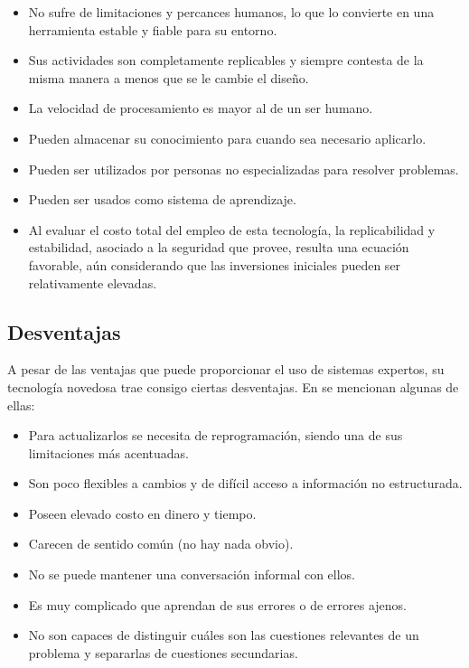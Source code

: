 \begin{itemize}
\item No sufre de limitaciones y percances humanos, lo que lo convierte en una herramienta estable y fiable para su entorno.
\item Sus actividades son completamente replicables y siempre contesta de la misma manera a menos que se le cambie el diseño.
\item La velocidad de procesamiento es mayor al de un ser humano.
\item Pueden almacenar su conocimiento para cuando sea necesario aplicarlo.
\item Pueden ser utilizados por personas no especializadas para resolver problemas.
\item Pueden ser usados como sistema de aprendizaje.
\item Al evaluar el costo total del empleo de esta tecnología, la replicabilidad y estabilidad, asociado a la seguridad que provee, resulta una ecuación favorable, aún considerando que las inversiones iniciales pueden ser
relativamente elevadas.
\end{itemize}

\subsection{Desventajas}
A pesar de las ventajas que puede proporcionar el uso de sistemas expertos, su tecnología novedosa trae consigo ciertas desventajas. En \cite{SystemExpertsEstudents} se mencionan algunas de ellas:

\begin{itemize}
\item Para actualizarlos se necesita de reprogramación, siendo una de sus limitaciones más acentuadas.
\item Son poco flexibles a cambios y de difícil acceso a información no estructurada.
\item Poseen elevado costo en dinero y tiempo. 
\item Carecen de sentido común (no hay nada obvio).
\item No se puede mantener una conversación informal con ellos.
\item Es muy complicado que aprendan de sus errores o de errores ajenos.
\item No son capaces de distinguir cuáles son las cuestiones relevantes de un
problema y separarlas de cuestiones secundarias.
\end{itemize}

